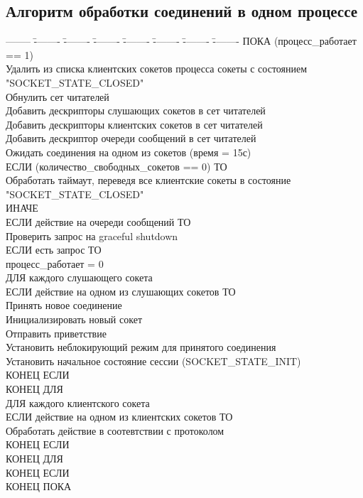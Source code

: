 \documentclass[a4paper,12pt]{report}
\begin{document}
\subsection*{Алгоритм обработки соединений в одном процессе}
\begin{tabbing}
-------- \= -------- \= -------- \= -------- \= -------- \= -------- \= -------- \= -------- \kill
\> ПОКА (процесс_работает == 1) \\
\> \> Удалить из списка клиентских сокетов процесса сокеты с состоянием "SOCKET_STATE_CLOSED" \\
\> \> Обнулить сет читателей \\
\> \> Добавить дескрипторы слушающих сокетов в сет читателей \\
\> \> Добавить дескрипторы клиентских сокетов в сет читателей \\
\> \> Добавить дескриптор очереди сообщений в сет читателей \\ 
\> \> Ожидать соединения на одном из сокетов (время = 15с) \\
\> \> ЕСЛИ (количество_свободных_сокетов == 0) ТО \\
\> \> \> Обработать таймаут, переведя все клиентские сокеты в состояние "SOCKET_STATE_CLOSED" \\
\> \> ИНАЧЕ \\
\> \> \> ЕСЛИ действие на очереди сообщений ТО \\
\> \> \> \> Проверить запрос на graceful shutdown \\
\> \> \> \> ЕСЛИ есть запрос ТО \\
\> \> \> \> \> процесс_работает = 0 \\
\> \> \> ДЛЯ каждого слушающего сокета \\
\> \> \> \> ЕСЛИ действие на одном из слушающих сокетов ТО \\
\> \> \> \> \> Принять новое соединение \\
\> \> \> \> \> Инициализировать новый сокет \\
\> \> \> \> \> Отправить приветствие \\
\> \> \> \> \> Установить неблокирующий режим для принятого соединения \\
\> \> \> \> \> Установить начальное состояние сессии (SOCKET_STATE_INIT) \\
\> \> \> \> КОНЕЦ ЕСЛИ \\
\> \> \> КОНЕЦ ДЛЯ \\
\> \> \> ДЛЯ каждого клиентского сокета \\
\> \> \> \> ЕСЛИ действие на одном из клиентских сокетов ТО \\
\> \> \> \> \> Обработать действие в соотевтствии с протоколом \\
\> \> \> \> КОНЕЦ ЕСЛИ \\
\> \> \> КОНЕЦ ДЛЯ \\
\> \> КОНЕЦ ЕСЛИ \\
\> КОНЕЦ ПОКА \\

\end{tabbing}
\end{document}

